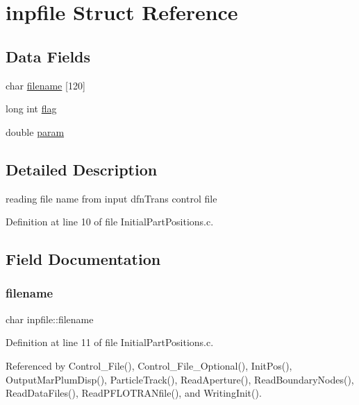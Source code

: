 \hypertarget{structinpfile}{}\section{inpfile Struct Reference}
\label{structinpfile}
\subsection*{Data Fields}
\begin{DoxyCompactItemize}
\item 
char \mbox{\hyperlink{structinpfile_a66e8759aa38ee20350f04cdc58dee702}{filename}} \mbox{[}120\mbox{]}
\item 
long int \mbox{\hyperlink{structinpfile_a23ae60bf94767194de9a09a4eee8cc1d}{flag}}
\item 
double \mbox{\hyperlink{structinpfile_a57ff2cce78c35a8a128927da9eeccfbc}{param}}
\end{DoxyCompactItemize}


\subsection{Detailed Description}
reading file name from input dfn\+Trans control file 

Definition at line 10 of file Initial\+Part\+Positions.\+c.



\subsection{Field Documentation}
\mbox{\label{structinpfile_a66e8759aa38ee20350f04cdc58dee702}} 
\subsubsection{\texorpdfstring{filename}{filename}}
{\footnotesize\ttfamily char inpfile\+::filename}



Definition at line 11 of file Initial\+Part\+Positions.\+c.



Referenced by Control\+\_\+\+File(), Control\+\_\+\+File\+\_\+\+Optional(), Init\+Pos(), Output\+Mar\+Plum\+Disp(), Particle\+Track(), Read\+Aperture(), Read\+Boundary\+Nodes(), Read\+Data\+Files(), Read\+P\+F\+L\+O\+T\+R\+A\+Nfile(), and Writing\+Init().

